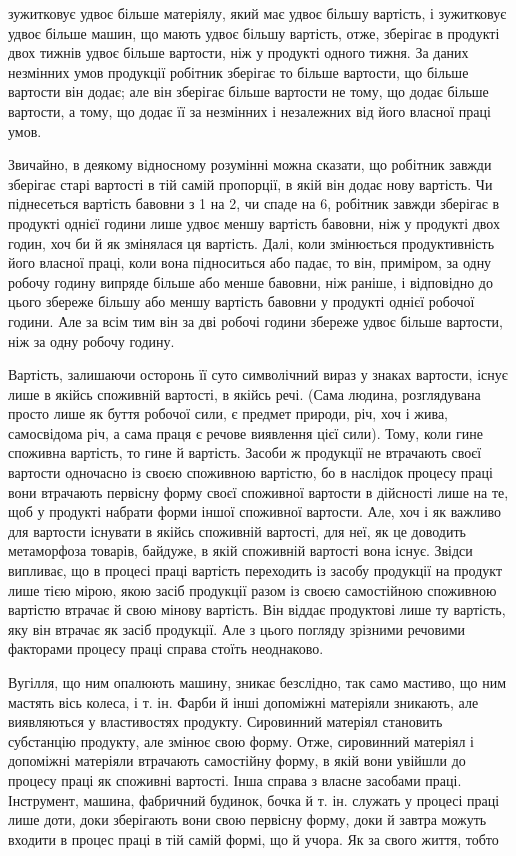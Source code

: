 \parcont{}  %
зужитковує удвоє більше матеріялу, який має удвоє більшу
вартість, і зужитковує удвоє більше машин, що мають удвоє
більшу вартість, отже, зберігає в продукті двох тижнів удвоє
більше вартости, ніж у продукті одного тижня. За даних незмінних
умов продукції робітник зберігає то більше вартости, що
більше вартости він додає; але він зберігає більше вартости не
тому, що додає більше вартости, а тому, що додає її за незмінних
і незалежних від його власної праці умов.

Звичайно, в деякому відносному розумінні можна сказати,
що робітник завжди зберігає старі вартості в тій самій пропорції, в
якій він додає нову вартість. Чи піднесеться вартість бавовни з
1 на 2, чи спаде на 6, робітник завжди
зберігає в продукті однієї години лише удвоє меншу вартість
бавовни, ніж у продукті двох годин, хоч би й як змінялася ця
вартість. Далі, коли змінюється продуктивність його власної праці,
коли вона підноситься або падає, то він, приміром, за одну робочу
годину випряде більше або менше бавовни, ніж раніше, і відповідно
до цього збереже більшу або меншу вартість бавовни у
продукті однієї робочої години. Але за всім тим він за дві робочі
години збереже удвоє більше вартости, ніж за одну робочу годину.

Вартість, залишаючи осторонь її суто символічний вираз у
знаках вартости, існує лише в якійсь споживній вартості, в якійсь
речі. (Сама людина, розглядувана просто лише як буття робочої
сили, є предмет природи, річ, хоч і жива, самосвідома річ, а сама
праця є речове виявлення цієї сили). Тому, коли гине споживна
вартість, то гине й вартість. Засоби ж продукції не втрачають
своєї вартости одночасно із своєю споживною вартістю, бо в наслідок
процесу праці вони втрачають первісну форму своєї споживної
вартости в дійсності лише на те, щоб у продукті набрати форми
іншої споживної вартости. Але, хоч і як важливо для вартости
існувати в якійсь споживній вартості, для неї, як це доводить
метаморфоза товарів, байдуже, в якій споживній вартості вона
існує. Звідси випливає, що в процесі праці вартість переходить
із засобу продукції на продукт лише тією мірою, якою засіб продукції
разом із своєю самостійною споживною вартістю втрачає
й свою мінову вартість. Він віддає продуктові лише ту вартість,
яку він втрачає як засіб продукції. Але з цього погляду зрізними
речовими факторами процесу праці справа стоїть неоднаково.

Вугілля, що ним опалюють машину, зникає безслідно, так
само мастиво, що ним мастять вісь колеса, і т. ін. Фарби й інші
допоміжні матеріяли зникають, але виявляються у властивостях
продукту. Сировинний матеріял становить субстанцію продукту,
але змінює свою форму. Отже, сировинний матеріял і допоміжні
матеріяли втрачають самостійну форму, в якій вони увійшли до
процесу праці як споживні вартості. Інша справа з власне засобами
праці. Інструмент, машина, фабричний будинок, бочка й
т. ін. служать у процесі праці лише доти, доки зберігають вони
свою первісну форму, доки й завтра можуть входити в процес
праці в тій самій формі, що й учора. Як за свого життя, тобто
\parbreak{}  %
